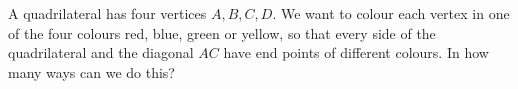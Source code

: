 A quadrilateral has four vertices $A,B,C,D$. We want to colour each vertex in one of the four colours red, blue, green or yellow, so that every side of the quadrilateral and the diagonal $AC$ have end points of different colours. In how many ways can we do this?
